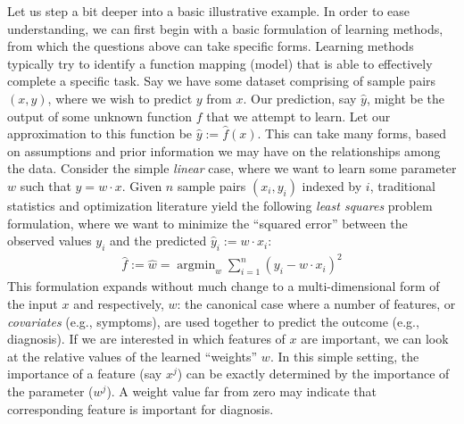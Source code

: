 Let us step a bit deeper into a basic illustrative example. In order to ease understanding, we can first begin with a basic formulation of learning methods, from which the questions above can take specific forms. 
Learning methods typically  try to identify a function mapping (model) that is able to effectively complete a specific task.
Say we have some dataset comprising of sample pairs $(x,y)$, where we wish to predict $y$ from $x$.
Our prediction, say $\hat{y}$, might be the output of some unknown function $f$ that we attempt to learn. 
Let our approximation to this function be $\hat{y}:=\hat{f}(x)$.
This can take many forms, 
based on assumptions and prior information we may have on the relationships among the data. 
Consider the simple \textit{linear} case,
where we want to learn some parameter $w$ such that $y = w\cdot x$. 
Given $n$ sample pairs $(x_i,y_i)$ indexed by $i$, traditional statistics and optimization literature yield the following \textit{least squares} problem formulation, where we want to minimize the ``squared error'' between the observed values $y_i$ and the predicted $\hat{y}_i:= w\cdot x_i$:
\begin{align}\label{eq:lq}
\hat{f}:=\hat{w} = \mathop{\arg\min}_{w} \sum_{i=1}^n (y_i - w\cdot x_i)^2
\end{align}
This formulation expands without much change to a multi-dimensional form of the input $x$ and respectively, $w$: the canonical case where a number of features, or \textit{covariates} (e.g., symptoms), are used together to predict the outcome (e.g., diagnosis). 
If we are interested in which features of $x$ are important, we can look at the relative values of the learned ``weights'' $w$. In this simple setting, the importance of a feature (say $x^j$) can be exactly determined by the importance of the parameter ($w^j$).
A weight value far from zero may indicate that corresponding feature is important for diagnosis.

